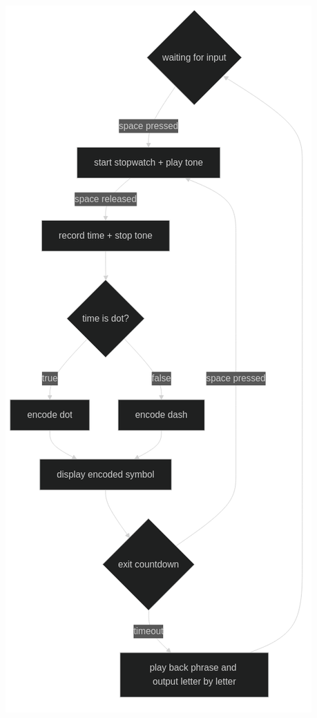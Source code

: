 \documentclass[12pt]{article}
\begin{document}
\begin{center}
    \includegraphics[scale=0.6]{o-2.png}
\end{center}
\end{document}

